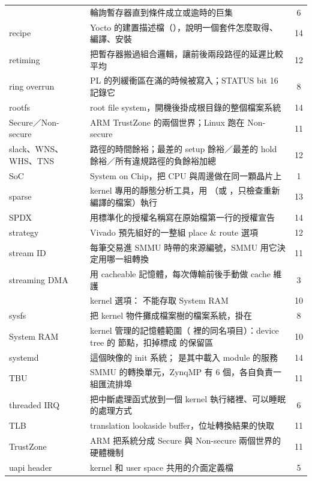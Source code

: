 \begin{xltabular}{\textwidth}{l X c}
 & 輪詢暫存器直到條件成立或逾時的巨集 & 6 \\
recipe & Yocto 的建置描述檔（），說明一個套件怎麼取得、編譯、安裝 & 14 \\
retiming & 把暫存器搬過組合邏輯，讓前後兩段路徑的延遲比較平均 & 12 \\
ring overrun & PL 的列緩衝區在滿的時候被寫入；STATUS bit 16 記錄它 & 8 \\
rootfs & root file system，開機後掛成根目錄的整個檔案系統 & 14 \\
Secure／Non-secure & ARM TrustZone 的兩個世界；Linux 跑在 Non-secure & 11 \\
slack、WNS、WHS、TNS & 路徑的時間餘裕；最差的 setup 餘裕／最差的 hold 餘裕／所有違規路徑的負餘裕加總 & 12 \\
SoC & System on Chip，把 CPU 與周邊做在同一顆晶片上 & 1 \\
sparse & kernel 專用的靜態分析工具，用 （或 ，只檢查重新編譯的檔案）執行 & 13 \\
SPDX & 用標準化的授權名稱寫在原始檔第一行的授權宣告 & 14 \\
strategy & Vivado 預先組好的一整組 place \& route 選項 & 12 \\
stream ID & 每筆交易進 SMMU 時帶的來源編號，SMMU 用它決定用哪一組轉換 & 11 \\
streaming DMA & 用 cacheable 記憶體，每次傳輸前後手動做 cache 維護 & 3 \\
 & kernel 選項： 不能存取 System RAM & 10 \\
sysfs & 把 kernel 物件攤成檔案樹的檔案系統，掛在  & 8 \\
System RAM & kernel 管理的記憶體範圍（ 裡的同名項目）：device tree 的  節點，扣掉標成  的保留區 & 10 \\
systemd & 這個映像的 init 系統； 是其中載入 module 的服務 & 14 \\
TBU & SMMU 的轉換單元，ZynqMP 有 6 個，各自負責一組匯流排埠 & 11 \\
threaded IRQ & 把中斷處理函式放到一個 kernel 執行緒裡、可以睡眠的處理方式 & 6 \\
TLB & translation lookaside buffer，位址轉換結果的快取 & 11 \\
TrustZone & ARM 把系統分成 Secure 與 Non-secure 兩個世界的硬體機制 & 11 \\
uapi header & kernel 和 user space 共用的介面定義檔 & 5 \\

\end{xltabular}
